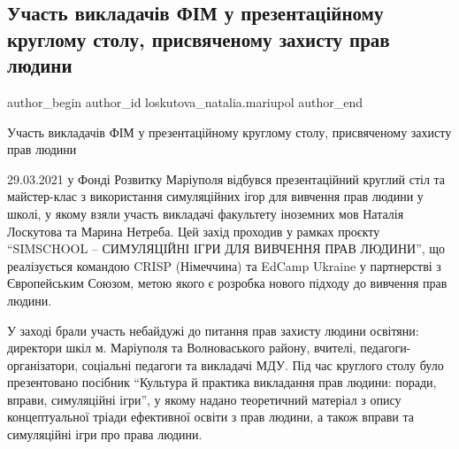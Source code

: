  
 
 
 
 

\subsection{Участь викладачів ФІМ у презентаційному круглому столу, присвяченому захисту прав людини}
\label{sec:29_03_2021.fb.loskutova_natalia.mariupol.1.kruglyj_stil_zahyst_prav_ljudyny}

\ifcmt
 author_begin
   author_id loskutova_natalia.mariupol
 author_end
\fi

Участь викладачів ФІМ у презентаційному круглому столу, присвяченому захисту прав людини

29.03.2021 у Фонді Розвитку Маріуполя відбувся презентаційний круглий стіл та
майстер-клас з використання симуляційних ігор для вивчення прав людини у школі,
у якому взяли участь викладачі факультету іноземних мов Наталія Лоскутова та
Марина Нетреба. Цей захід проходив у рамках проєкту \enquote{SIMSCHOOL – СИМУЛЯЦІЙНІ
ІГРИ ДЛЯ ВИВЧЕННЯ ПРАВ ЛЮДИНИ}, що реалізується командою CRISP (Німеччина) та
EdCamp Ukraine у партнерстві з Європейським Союзом, метою якого є розробка
нового підходу до вивчення прав людини. 


У заході брали участь небайдужі до
питання прав захисту людини освітяни: директори шкіл м. Маріуполя та
Волноваського району, вчителі, педагоги-організатори, соціальні педагоги та
викладачі МДУ. Під час круглого столу було презентовано посібник \enquote{Культура й
практика викладання прав людини: поради, вправи, симуляційні ігри}, у якому
надано теоретичний матеріал з опису концептуальної тріади ефективної освіти з
прав людини, а також вправи та симуляційні ігри про права людини. 

